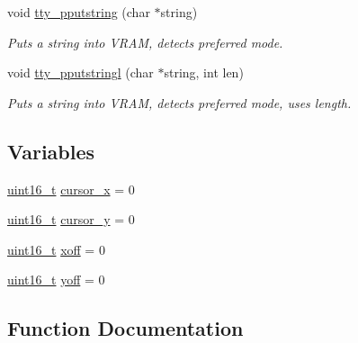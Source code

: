 \begin{DoxyCompactItemize}
void \hyperlink{a00149_ade960b1320324706aac6c00cc6b1b2fe_ade960b1320324706aac6c00cc6b1b2fe}{tty\+\_\+pputstring} (char $\ast$string)
\begin{DoxyCompactList}\small\item\em Puts a string into V\+R\+AM, detects preferred mode. \end{DoxyCompactList}\item 
void \hyperlink{a00149_abaf93f9e56ddb7b10462070f59e534e4_abaf93f9e56ddb7b10462070f59e534e4}{tty\+\_\+pputstringl} (char $\ast$string, int len)
\begin{DoxyCompactList}\small\item\em Puts a string into V\+R\+AM, detects preferred mode, uses length. \end{DoxyCompactList}\end{DoxyCompactItemize}
\subsection*{Variables}
\begin{DoxyCompactItemize}
\item 
\hyperlink{a00125_a273cf69d639a59973b6019625df33e30_a273cf69d639a59973b6019625df33e30}{uint16\+\_\+t} \hyperlink{a00149_ae69604af0f9bd5fca2a016d0aa1ba7e1_ae69604af0f9bd5fca2a016d0aa1ba7e1}{cursor\+\_\+x} = 0
\item 
\hyperlink{a00125_a273cf69d639a59973b6019625df33e30_a273cf69d639a59973b6019625df33e30}{uint16\+\_\+t} \hyperlink{a00149_a0301c5492919c401c2c1ecf52af709b0_a0301c5492919c401c2c1ecf52af709b0}{cursor\+\_\+y} = 0
\item 
\hyperlink{a00125_a273cf69d639a59973b6019625df33e30_a273cf69d639a59973b6019625df33e30}{uint16\+\_\+t} \hyperlink{a00149_abaa0d20f0e52ce0d3a7d706f6ac16266_abaa0d20f0e52ce0d3a7d706f6ac16266}{xoff} = 0
\item 
\hyperlink{a00125_a273cf69d639a59973b6019625df33e30_a273cf69d639a59973b6019625df33e30}{uint16\+\_\+t} \hyperlink{a00149_a1a7539764d0ae8cd06ce45c62cf92bca_a1a7539764d0ae8cd06ce45c62cf92bca}{yoff} = 0
\end{DoxyCompactItemize}


\subsection{Function Documentation}
\mbox{\label{a00149_aff4bc17c602603d120756f52e18ebb96_aff4bc17c602603d120756f52e18ebb96}} 
